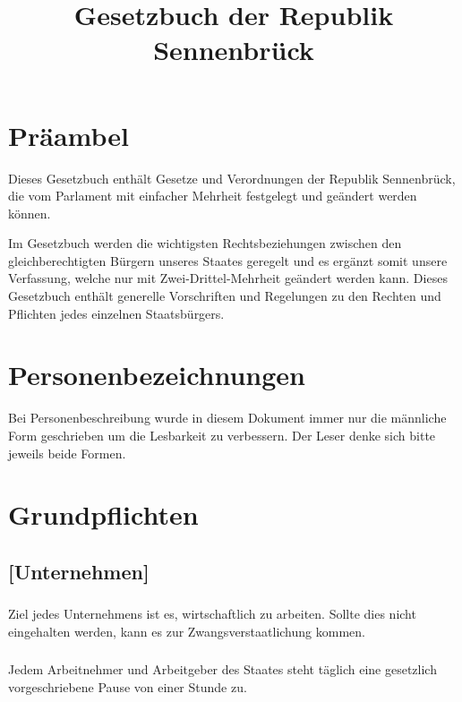\documentclass[a4paper, 11pt]{report}
\title{Gesetzbuch der Republik Sennenbrück}
\author{}
\let\oldsubsection\subsection
\renewcommand{\subsection}{\leftskip=40pt\oldsubsection}
\begin{document}
\maketitle

\tableofcontents
\newpage


\section*{Präambel}

Dieses Gesetzbuch enthält Gesetze und Verordnungen der Republik Sennenbrück, die vom Parlament mit einfacher Mehrheit festgelegt und geändert werden können.

Im Gesetzbuch werden die wichtigsten Rechtsbeziehungen zwischen den gleichberechtigten Bürgern unseres Staates geregelt und es ergänzt somit unsere Verfassung, welche nur mit Zwei-Drittel-Mehrheit geändert werden kann. Dieses Gesetzbuch enthält generelle Vorschriften und Regelungen zu den Rechten und Pflichten jedes einzelnen Staatsbürgers. 


\section*{Personenbezeichnungen}

Bei Personenbeschreibung wurde in diesem Dokument immer nur die männliche Form geschrieben um die Lesbarkeit zu verbessern. Der Leser denke sich bitte jeweils beide Formen.

\section{Grundpflichten}

 

\subsection{[Unternehmen]}

 
\subsubsection{}
Ziel jedes Unternehmens ist es, wirtschaftlich zu arbeiten. Sollte dies nicht eingehalten werden, kann es zur Zwangsverstaatlichung kommen. 

\subsubsection{}
Jedem Arbeitnehmer und Arbeitgeber des Staates steht täglich eine gesetzlich vorgeschriebene Pause von einer Stunde zu. 
\end{document}
